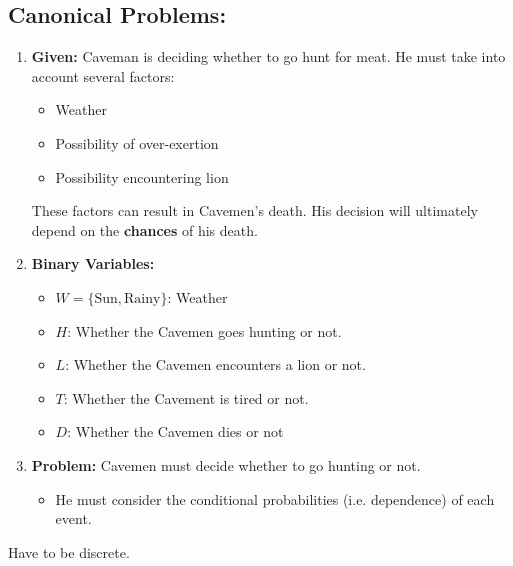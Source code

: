 \subsection{Canonical Problems:}
\begin{example}
    \begin{enumerate}
        \item \textbf{Given:} Caveman is deciding whether to go hunt for meat. He must take into account several factors:
        \begin{itemize}
            \item Weather
            \item Possibility of over-exertion
            \item Possibility encountering lion
        \end{itemize}

        These factors can result in Cavemen's death. His decision will ultimately depend on the \textbf{chances} of his death.
        \item \textbf{Binary Variables:}
        \begin{itemize}
            \item $W = \{\text{Sun}, \text{Rainy}\}$: Weather
            \item $H$: Whether the Cavemen goes hunting or not.
            \item $L$: Whether the Cavemen encounters a lion or not.
            \item $T$: Whether the Cavement is tired or not.
            \item $D$: Whether the Cavemen dies or not
        \end{itemize}
        \item \textbf{Problem:} Cavemen must decide whether to go hunting or not. 
        \begin{itemize}
            \item He must consider the conditional probabilities (i.e. dependence) of each event.
        \end{itemize}
    \end{enumerate}
\end{example}

\begin{warning}
    Have to be discrete. 
\end{warning}
\newpage


